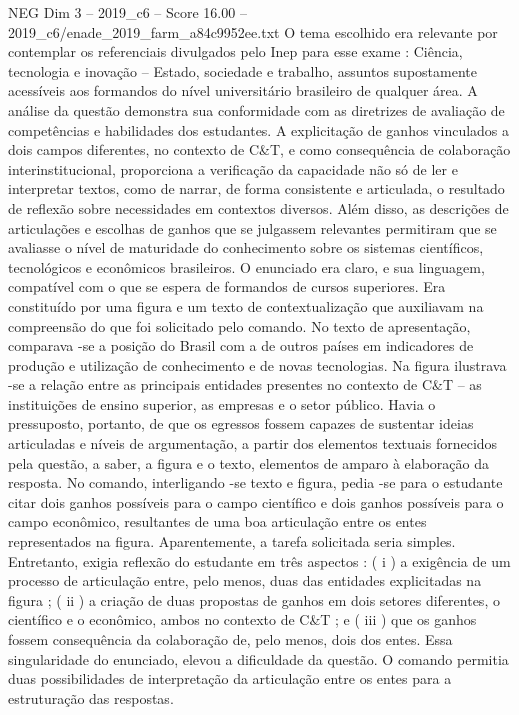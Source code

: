 \begin{textsample}{NEG Dim 3 – 2019\_c6 – Score 16.00 – 2019\_c6/enade\_2019\_farm\_a84c9952ee.txt}
O tema escolhido era relevante por contemplar os referenciais divulgados pelo Inep para esse exame : Ciência, tecnologia e inovação – Estado, sociedade e trabalho, assuntos supostamente acessíveis aos formandos do nível universitário brasileiro de qualquer área.
A análise da questão demonstra sua conformidade com as diretrizes de avaliação de competências e habilidades dos estudantes.
A explicitação de ganhos vinculados a dois campos diferentes, no contexto de C\&T, e como consequência de colaboração interinstitucional, proporciona a verificação da capacidade não só de ler e interpretar textos, como de narrar, de forma consistente e articulada, o resultado de reflexão sobre necessidades em contextos diversos.
Além disso, as descrições de articulações e escolhas de ganhos que se julgassem relevantes permitiram que se avaliasse o nível de maturidade do conhecimento sobre os sistemas científicos, tecnológicos e econômicos brasileiros.
O enunciado era claro, e sua linguagem, compatível com o que se espera de formandos de cursos superiores.
Era constituído por uma figura e um texto de contextualização que auxiliavam na compreensão do que foi solicitado pelo comando.
No texto de apresentação, comparava -se a posição do Brasil com a de outros países em indicadores de produção e utilização de conhecimento e de novas tecnologias.
Na figura ilustrava -se a relação entre as principais entidades presentes no contexto de C\&T – as instituições de ensino superior, as empresas e o setor público.
Havia o pressuposto, portanto, de que os egressos fossem capazes de sustentar ideias articuladas e níveis de argumentação, a partir dos elementos textuais fornecidos pela questão, a saber, a figura e o texto, elementos de amparo à elaboração da resposta.
No comando, interligando -se texto e figura, pedia -se para o estudante citar dois ganhos possíveis para o campo científico e dois ganhos possíveis para o campo econômico, resultantes de uma boa articulação entre os entes representados na figura.
Aparentemente, a tarefa solicitada seria simples.
Entretanto, exigia reflexão do estudante em três aspectos : ( i ) a exigência de um processo de articulação entre, pelo menos, duas das entidades explicitadas na figura ; ( ii ) a criação de duas propostas de ganhos em dois setores diferentes, o científico e o econômico, ambos no contexto de C\&T ; e ( iii ) que os ganhos fossem consequência da colaboração de, pelo menos, dois dos entes.
Essa singularidade do enunciado, elevou a dificuldade da questão.
O comando permitia duas possibilidades de interpretação da articulação entre os entes para a estruturação das respostas.

\end{textsample}
